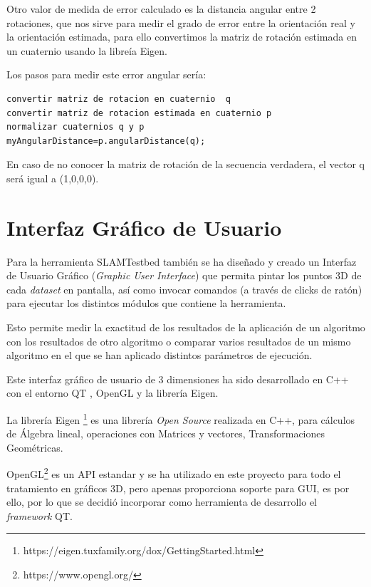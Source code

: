 Otro valor de medida de error calculado es la distancia angular entre 2 rotaciones, que nos sirve para medir el grado de error entre la orientación real y la orientación estimada, para ello convertimos la matriz de rotación estimada en un cuaternio usando la libreía Eigen.

Los pasos para medir este error angular sería:
\begin{lstlisting}[frame=single]
convertir matriz de rotacion en cuaternio  q
convertir matriz de rotacion estimada en cuaternio p
normalizar cuaternios q y p
myAngularDistance=p.angularDistance(q);

\end{lstlisting}

En caso de no conocer la matriz de rotación de la secuencia verdadera, el vector q será igual a (1,0,0,0).








\section{Interfaz Gráfico de Usuario}
Para la herramienta SLAMTestbed también se ha diseñado y creado un Interfaz de Usuario Gráfico (\textit{Graphic User Interface}) que permita pintar los puntos 3D de cada \textit{dataset} en pantalla, así como invocar comandos (a través de clicks de ratón) para ejecutar los distintos módulos que contiene la herramienta.

Esto permite medir la exactitud de los resultados de la aplicación de un algoritmo con los resultados de otro algoritmo o comparar varios resultados de un mismo algoritmo en el que se han aplicado distintos parámetros de ejecución.

Este interfaz gráfico de usuario de 3 dimensiones ha sido desarrollado en C++ con el entorno QT , OpenGL y la librería Eigen. 

La librería Eigen \footnote{https://eigen.tuxfamily.org/dox/GettingStarted.html} es una librería \textit{Open Source} realizada en C++, para cálculos de Álgebra lineal, operaciones con Matrices y vectores, Transformaciones Geométricas. 

OpenGL\footnote{https://www.opengl.org/} es un API estandar y se ha utilizado en este proyecto para todo el tratamiento en gráficos 3D, pero apenas proporciona soporte para GUI, es por ello, por lo que se decidió incorporar como herramienta de desarrollo el \textit{framework} QT. 

